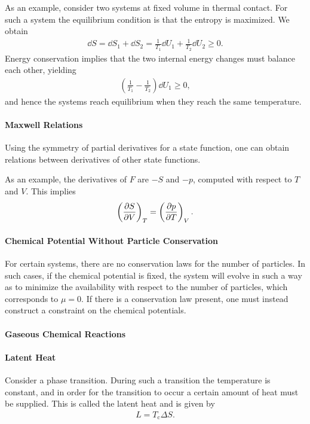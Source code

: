 As an example, consider two systems at fixed volume in thermal contact. For such a system the equilibrium condition is that the entropy is maximized. We obtain
\begin{align*}
	\dd{S} = \dd{S_{1}} + \dd{S_{2}} = \frac{1}{T_{1}}\dd{U_{1}} + \frac{1}{T_{2}}\dd{U_{2}} \geq 0.
\end{align*}
Energy conservation implies that the two internal energy changes must balance each other, yielding
\begin{align*}
	\left(\frac{1}{T_{1}} - \frac{1}{T_{2}}\right)\dd{U_{1}} \geq 0,
\end{align*}
and hence the systems reach equilibrium when they reach the same temperature.

\paragraph{Maxwell Relations}
Using the symmetry of partial derivatives for a state function, one can obtain relations between derivatives of other state functions.

As an example, the derivatives of $F$ are $-S$ and $-p$, computed with respect to $T$ and $V$. This implies
\begin{align*}
	\left(\pdv{S}{V}\right)_{T} = \left(\pdv{p}{T}\right)_{V}.
\end{align*}

\paragraph{Chemical Potential Without Particle Conservation}
For certain systems, there are no conservation laws for the number of particles. In such cases, if the chemical potential is fixed, the system will evolve in such a way as to minimize the availability with respect to the number of particles, which corresponds to $\mu = 0$. If there is a conservation law present, one must instead construct a constraint on the chemical potentials.

\paragraph{Gaseous Chemical Reactions}

\paragraph{Latent Heat}
Consider a phase transition. During such a transition the temperature is constant, and in order for the transition to occur a certain amount of heat must be supplied. This is called the latent heat and is given by
\begin{align*}
	L = T_{\text{c}}\Delta S.
\end{align*}


